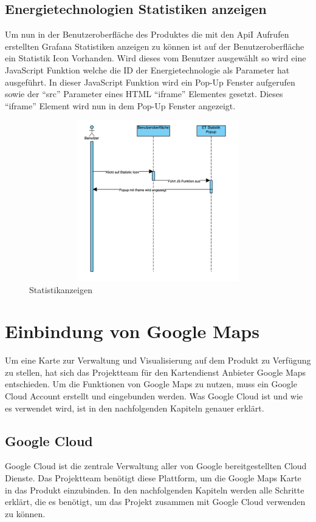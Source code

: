 \subsection{Energietechnologien Statistiken anzeigen}
Um nun in der Benutzeroberfläche des Produktes die mit den ApiI Aufrufen erstellten Grafana Statistiken anzeigen zu können ist auf der Benutzeroberfläche ein Statistik Icon Vorhanden. Wird dieses vom Benutzer ausgewählt so wird eine JavaScript Funktion welche die ID der Energietechnologie als Parameter hat ausgeführt. In dieser JavaScript Funktion wird ein Pop-Up Fenster aufgerufen sowie der “src” Parameter eines HTML “iframe” Elementes gesetzt. Dieses “iframe” Element wird nun in dem Pop-Up Fenster angezeigt.
\begin{figure}[h]
	\centering
	\includegraphics[height=7cm,width=14cm]{images/Statistikanzeigen}
	\caption{Statistikanzeigen}
	\label{fig:Statistikanzeigen }
\end{figure} 



\section{Einbindung von Google Maps}
Um eine Karte zur Verwaltung und Visualisierung auf dem Produkt zu Verfügung zu stellen, hat sich das Projektteam für den Kartendienst Anbieter Google Maps entschieden. Um die Funktionen von Google Maps zu nutzen, muss ein Google Cloud Account erstellt und eingebunden werden. Was Google Cloud ist und wie es verwendet wird, ist in den nachfolgenden Kapiteln genauer erklärt.

\subsection{Google Cloud}
Google Cloud ist die zentrale Verwaltung aller von Google bereitgestellten Cloud Dienste. Das Projektteam benötigt diese Plattform, um die Google Maps Karte in das Produkt einzubinden. In den nachfolgenden Kapiteln werden alle Schritte erklärt, die es benötigt, um das Projekt zusammen mit Google Cloud verwenden zu können.


